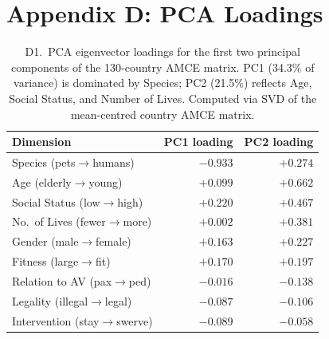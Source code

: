 \documentclass[11pt]{article}
\begin{document}
\section*{Appendix D: PCA Loadings}

\begin{table}[H]
\caption{D1.\ PCA eigenvector loadings for the first two principal components of
the 130-country AMCE matrix. PC1 (34.3\% of variance) is dominated by Species;
PC2 (21.5\%) reflects Age, Social Status, and Number of Lives.
Computed via SVD of the mean-centred country AMCE matrix.}
\label{tab:pca_loadings}
\centering
\begin{tabular}{lrr}
\toprule
\textbf{Dimension} & \textbf{PC1 loading} & \textbf{PC2 loading} \\
\midrule
Species (pets$\to$humans)        & $-0.933$ & $+0.274$ \\
Age (elderly$\to$young)          & $+0.099$ & $+0.662$ \\
Social Status (low$\to$high)     & $+0.220$ & $+0.467$ \\
No.\ of Lives (fewer$\to$more)   & $+0.002$ & $+0.381$ \\
Gender (male$\to$female)         & $+0.163$ & $+0.227$ \\
Fitness (large$\to$fit)          & $+0.170$ & $+0.197$ \\
Relation to AV (pax$\to$ped)     & $-0.016$ & $-0.138$ \\
Legality (illegal$\to$legal)     & $-0.087$ & $-0.106$ \\
Intervention (stay$\to$swerve)   & $-0.089$ & $-0.058$ \\
\bottomrule
\end{tabular}
\end{table}
\end{document}
